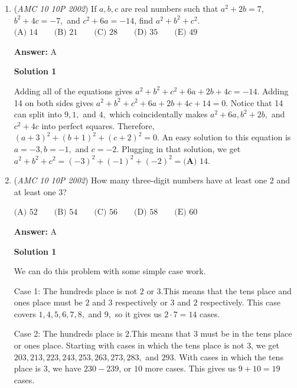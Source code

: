 \begin{enumerate}
 Case 1: $n-1 = 1$It is clear that $n = 2$.  We have $2^2 - 7(2) + 13 = 3$, so this case yields $n = 2$ as a solution.

 Case 2: $n^2 - 7n + 13 = 1$Solving for $n$ gives $n^2 - 7n + 12 = 0$ or $(n-3)(n-4) = 0$. Therefore, $n = 3$ or $n = 4$.Since both $3-1 = 2$ and $4-1 = 3$ are prime, both $n = 3$ and $n = 4$ work, yielding 2 solutions.

 Putting everything together, the answer is $1 + 2 = \boxed{\textbf{(C) }3}$.

 


	\item (\textit{AMC 10 10P 2002}) If $a,b,c$ are real numbers such that $a^2 + 2b =7$, $b^2 + 4c= -7,$ and $c^2 + 6a= -14$, find $a^2 + b^2 + c^2.$
$\text{(A) }14 \qquad \text{(B) }21 \qquad \text{(C) }28 \qquad \text{(D) }35 \qquad \text{(E) }49$

 \textbf{Answer: }A



\textbf{Solution 1}

Adding all of the equations gives $a^2 + b^2 +c^2 + 6a + 2b + 4c=-14.$ Adding 14 on both sides gives $a^2 + b^2 +c^2 + 6a + 2b + 4c+14=0.$ Notice that 14 can split into $9, 1,$ and $4,$ which coincidentally makes $a^2 +6a, b^2+2b,$ and $c^2+4c$ into perfect squares. Therefore, $(a+3)^2 + (b+1)^2 + (c+2) ^2 =0.$ An easy solution to this equation is $a=-3, b=-1,$ and $c=-2.$ Plugging in that solution, we get $a^2+b^2+c^2=(-3)^2+(-1)^2+(-2)^2=\boxed{\textbf{(A) } 14}.$



	\item (\textit{AMC 10 10P 2002}) How many three-digit numbers have at least one $2$ and at least one $3$?


 $\text{(A) }52 \qquad \text{(B) }54  \qquad \text{(C) }56 \qquad \text{(D) }58 \qquad \text{(E) }60$

 \textbf{Answer: }A



\textbf{Solution 1}

We can do this problem with some simple case work.

 Case 1: The hundreds place is not $2$ or $3.$This means that the tens place and ones place must be $2$ and $3$ respectively or $3$ and $2$ respectively. This case covers $1, 4, 5, 6, 7, 8,$ and $9,$ so it gives us $2 \cdot 7 = 14$ cases.

 Case 2: The hundreds place is $2.$This means that $3$ must be in the tens place or ones place. Starting with cases in which the tens place is not $3$, we get $203, 213, 223, 243, 253, 263, 273, 283,$ and $293.$  With cases in which the tens place is $3$, we have $230-239$, or $10$ more cases. This gives us $9 + 10=19$ cases.


\end{enumerate}
